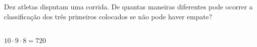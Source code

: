 \begin{ex}
Dez atletas disputam uma corrida. De quantas maneiras diferentes pode ocorrer a classificação dos três primeiros colocados se não pode haver empate?
 \begin{sol}
   \phantom{A} \\
   $10\cdot9\cdot8=720$
 \end{sol}
\end{ex}